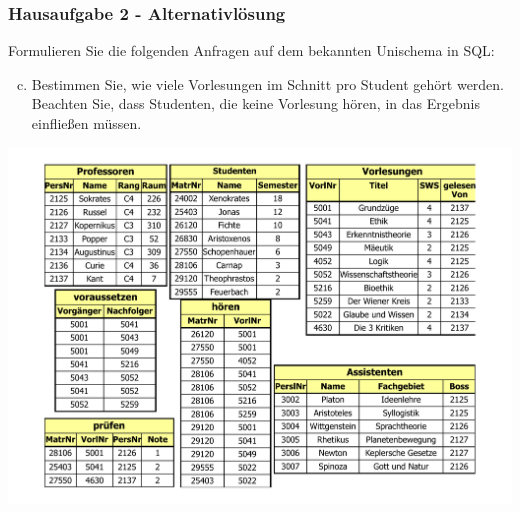 \begin{frame}[fragile]
	\frametitle{Hausaufgabe 2 - Alternativlösung}
	\vspace{0.25cm}

	\begin{multicols}{2}
		Formulieren Sie die folgenden Anfragen auf dem bekannten Unischema in SQL:
		\begin{enumerate}[a)]
			\setcounter{enumi}{2}
			\item Bestimmen Sie, wie viele Vorlesungen im Schnitt pro Student gehört werden. 
				  Beachten Sie, dass Studenten, die keine Vorlesung hören, in das Ergebnis einfließen müssen.
		\end{enumerate}
		\vfill\columnbreak

		\begin{center}
			\includegraphics[height=.6\paperheight]{../img/uni.pdf}
		\end{center}
	\end{multicols}
\end{frame}

